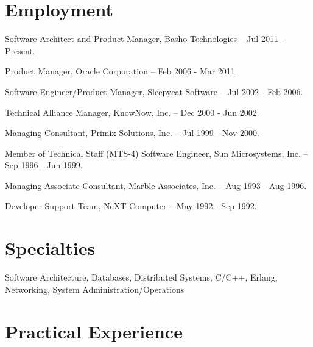 \documentclass[letterpaper]{article}
\renewenvironment{itemize}{
  \begin{list}{}{
    \setlength{\leftmargin}{1.5em}
  }
}{
  \end{list}
}
\begin{document}
\section*{Employment}

\begin{itemize}
\item Software Architect and Product Manager, Basho Technologies -- Jul 2011 - Present.
\item Product Manager, Oracle Corporation -- Feb 2006 - Mar 2011.
\item Software Engineer/Product Manager, Sleepycat Software -- Jul 2002 - Feb 2006.
\item Technical Alliance Manager, KnowNow, Inc. -- Dec 2000 - Jun 2002.
\item Managing Consultant, Primix Solutions, Inc. -- Jul 1999 - Nov 2000.
\item Member of Technical Staff (MTS-4) Software Engineer, Sun Microsystems, Inc. -- Sep 1996 - Jun 1999.
\item Managing Associate Consultant, Marble Associates, Inc. -- Aug 1993 - Aug 1996.
\item Developer Support Team, NeXT Computer -- May 1992 - Sep 1992.
\end{itemize}

\section*{Specialties}

\begin{itemize}
\item Software Architecture, Databases, Distributed Systems, C/C++, Erlang,
  Networking, System Administration/Operations
\end{itemize}


\section*{Practical Experience}
\end{document}
